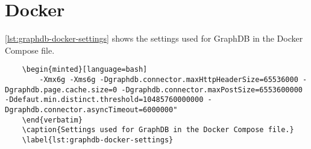 \chapter{Docker}\label{cha:docker}
\autoref{lst:graphdb-docker-settings} shows the settings used for GraphDB in the Docker Compose file.

\begin{lstlisting}
    \begin{minted}[language=bash]
        -Xmx6g -Xms6g -Dgraphdb.connector.maxHttpHeaderSize=65536000 -Dgraphdb.page.cache.size=0 -Dgraphdb.connector.maxPostSize=6553600000 -Ddefaut.min.distinct.threshold=10485760000000 -Dgraphdb.connector.asyncTimeout=6000000"        
    \end{verbatim}
    \caption{Settings used for GraphDB in the Docker Compose file.}
    \label{lst:graphdb-docker-settings}
\end{lstlisting}
